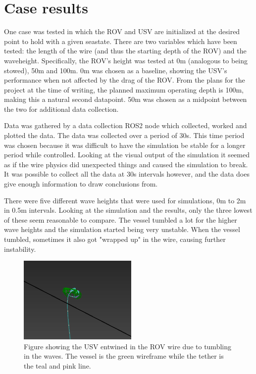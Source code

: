 \documentclass[class=article, crop=false]{standalone}
\begin{document}
\section{Case results}
One case was tested in which the ROV and USV are initialized at the desired point to hold with a given seastate. There are two variables which have been tested: the length of the wire (and thus the starting depth of the ROV) and the waveheight. Specifically, the ROV's height was tested at 0m (analogous to being stowed), 50m and 100m. 0m was chosen as a baseline, showing the USV's performance when not affected by the drag of the ROV. From the plans for the project at the time of writing, the planned maximum operating depth is 100m, making this a natural second datapoint. 50m was chosen as a midpoint between the two for additional data collection.

Data was gathered by a data collection ROS2 node which collected, worked and plotted the data. The data was collected over a period of 30s. This time period was chosen because it was difficult to have the simulation be stable for a longer period while controlled. Looking at the visual output of the simulation it seemed as if the wire physics did unexpected things and caused the simulation to break. It was possible to collect all the data at 30s intervals however, and the data does give enough information to draw conclusions from.

There were five different wave heights that were used for simulations, 0m to 2m in 0.5m intervals. Looking at the simulation and the results, only the three lowest of these seem reasonable to compare. The vessel tumbled a lot for the higher wave heights and the simulation started being very unstable. When the vessel tumbled, sometimes it also got "wrapped up" in the wire, causing further instability.

\begin{figure}[h]
    \centering
    \includegraphics{entwined}
    \caption{Figure showing the USV entwined in the ROV wire due to tumbling in the waves. The vessel is the green wireframe while the tether is the teal and pink line.}
    \label{fig:entwined}
\end{figure}
\end{document}
